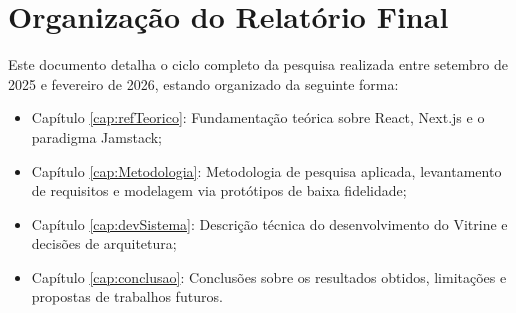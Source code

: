 \section{Organização do Relatório Final}
Este documento detalha o ciclo completo da pesquisa realizada entre setembro de 2025 e fevereiro de 2026, estando organizado da seguinte forma:

\begin{itemize}
    \item Capítulo \ref{cap:refTeorico}: Fundamentação teórica sobre React, Next.js e o paradigma Jamstack;
    \item Capítulo \ref{cap:Metodologia}: Metodologia de pesquisa aplicada, levantamento de requisitos e modelagem via protótipos de baixa fidelidade;
    \item Capítulo \ref{cap:devSistema}: Descrição técnica do desenvolvimento do Vitrine e decisões de arquitetura;
    \item Capítulo \ref{cap:conclusao}: Conclusões sobre os resultados obtidos, limitações e propostas de trabalhos futuros.
\end{itemize}